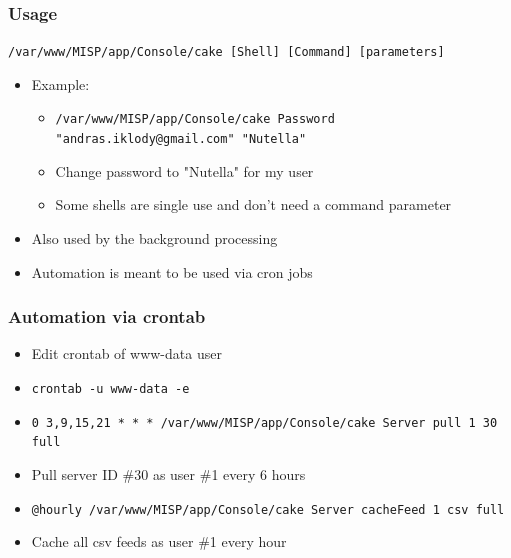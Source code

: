 \begin{frame}
\frametitle{Usage}
    \texttt{/var/www/MISP/app/Console/cake [Shell] [Command] [parameters]}
    \begin{itemize}
        \item Example:
        \begin{itemize}
            \item \texttt{/var/www/MISP/app/Console/cake Password "andras.iklody@gmail.com" "Nutella"}
            \item Change password to "Nutella" for my user
            \item Some shells are single use and don't need a command parameter
        \end{itemize}
        \item Also used by the background processing
        \item Automation is meant to be used via cron jobs
    \end{itemize}
\end{frame}

\begin{frame}
\frametitle{Automation via crontab}
    \begin{itemize}
        \item Edit crontab of www-data user
        \item \texttt{crontab -u www-data -e}
        \item \texttt{0 3,9,15,21 * * * /var/www/MISP/app/Console/cake Server pull 1 30 full}
        \item Pull server ID \#30 as user \#1 every 6 hours
        \item \texttt{@hourly /var/www/MISP/app/Console/cake Server cacheFeed 1 csv full}
        \item Cache all csv feeds as user \#1 every hour
    \end{itemize}
\end{frame}



